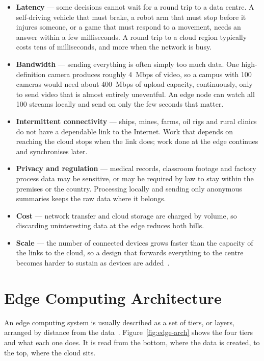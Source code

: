 \documentclass[../main.tex]{subfiles}
\begin{document}
\begin{itemize}
  \item \textbf{Latency} --- some decisions cannot wait for a round trip to a
        data centre. A self-driving vehicle that must brake, a robot arm that
        must stop before it injures someone, or a game that must respond to a
        movement, needs an answer within a few milliseconds. A round trip to
        a cloud region typically costs tens of milliseconds, and more when
        the network is busy.
  \item \textbf{Bandwidth} --- sending everything is often simply too much
        data. One high-definition camera produces roughly 4~Mbps of video, so
        a campus with 100 cameras would need about 400~Mbps of upload
        capacity, continuously, only to send video that is almost entirely
        uneventful. An edge node can watch all 100 streams locally and send
        on only the few seconds that matter.
  \item \textbf{Intermittent connectivity} --- ships, mines, farms, oil rigs
        and rural clinics do not have a dependable link to the Internet. Work
        that depends on reaching the cloud stops when the link does; work
        done at the edge continues and synchronises later.
  \item \textbf{Privacy and regulation} --- medical records, classroom
        footage and factory process data may be sensitive, or may be required
        by law to stay within the premises or the country. Processing locally
        and sending only anonymous summaries keeps the raw data where it
        belongs.
  \item \textbf{Cost} --- network transfer and cloud storage are charged by
        volume, so discarding uninteresting data at the edge reduces both
        bills.
  \item \textbf{Scale} --- the number of connected devices grows faster than
        the capacity of the links to the cloud, so a design that forwards
        everything to the centre becomes harder to sustain as devices are
        added~.
\end{itemize}

\section{Edge Computing Architecture}

An edge computing system is usually described as a set of tiers, or layers,
arranged by distance from the data~.
Figure~\ref{fig:edge-arch} shows the four tiers and what each one does. It is
read from the bottom, where the data is created, to the top, where the cloud
sits.
\end{document}
